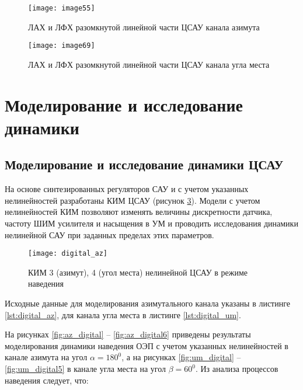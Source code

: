 \begin{figure}[!ht]
	\centering
	\texttt{[image: image55]} 
	\caption{ЛАХ и ЛФХ разомкнутой линейной части ЦСАУ канала азимута}
	\label{fig:DSAU}
\end{figure}

\begin{figure}[!ht]
	\centering
	\texttt{[image: image69]} 
	\caption{ЛАХ и ЛФХ разомкнутой линейной части ЦСАУ канала угла места}
	\label{fig:DSAU2}
\end{figure}

\section{Моделирование и исследование динамики} \label{subsec:ch4/modeling}

\subsection{Моделирование и исследование динамики ЦСАУ} \label{subsec:ch4/sect4/sub4}

На основе синтезированных регуляторов САУ и с учетом указанных нелинейностей разработаны КИМ ЦСАУ (рисунок \ref{fig:digital_az}). Модели с учетом нелинейностей КИМ позволяют изменять величины дискретности датчика, частоту ШИМ усилителя и насыщения в УМ и проводить исследования динамики нелинейной САУ при заданных пределах этих параметров. 


\begin{figure}
	\centering
	\texttt{[image: digital\_az]} 
	\caption{КИМ 3 (азимут), 4 (угол места) нелинейной ЦСАУ в режиме наведения}
	\label{fig:digital_az}
\end{figure}

Исходные данные для моделирования азимутального канала указаны в листинге \ref{lst:digital_az}, для канала угла места в листинге \ref{lst:digital_um}. 

\begingroup
\captiondelim{ } %

\endgroup

\begingroup
\captiondelim{ } %

\endgroup

На рисунках \ref{fig:az_digital} – \ref{fig:az_digital6} приведены результаты моделирования динамики наведения ОЭП с учетом указанных нелинейностей в канале азимута на угол  $\alpha=180^0$, а на рисунках \ref{fig:um_digital} – \ref{fig:um_digital5} в канале угла места на угол  $\beta=60^0$. Из анализа процессов наведения следует, что:\par

